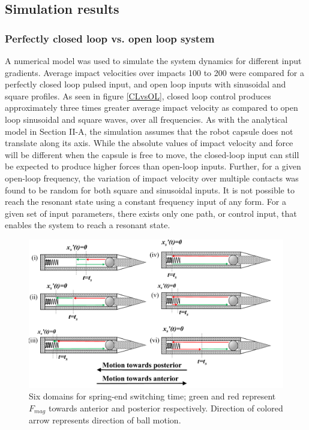 \documentclass[letterpaper, 10 pt, conference]{ieeeconf}  %
\begin{document}
\subsection{Simulation results}

\subsubsection{Perfectly closed loop vs. open loop system}
\label{clol}

A numerical model was used to simulate the system dynamics for different input gradients. Average impact velocities over impacts 100 to 200 were compared for a perfectly closed loop pulsed input, and open loop inputs with sinusoidal and square profiles. As seen in figure \ref{CLvsOL}, closed loop control produces approximately three times greater average impact velocity as compared to open loop sinusoidal and square waves, over all frequencies. As with the analytical model in Section II-A, the simulation assumes that the robot capsule does not translate along its axis. While the absolute values of impact velocity and force will be different when the capsule is free to move, the closed-loop input can still be expected to produce higher forces than open-loop inputs. Further, for a given open-loop frequency, the variation of impact velocity over multiple contacts was found to be random for both square and sinusoidal inputs. It is not possible to reach the resonant state using a constant frequency input of any form. For a given set of input parameters, there exists only one path, or control input, that enables the system to reach a resonant state. 
\begin{figure}
	\includegraphics[width=\linewidth]{Tswitchcases.pdf}
	\caption{Six domains for spring-end switching time; green and red represent $F_{mag}$ towards anterior and posterior respectively. Direction of colored arrow represents direction of ball motion.}
	\label{Tswitch}
\end{figure}
\end{document}
